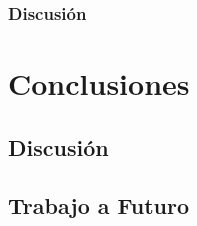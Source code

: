 \subsection{Discusión}


\chapter{Conclusiones}
\section{Discusión}

\section{Trabajo a Futuro}

\nocite{*}
